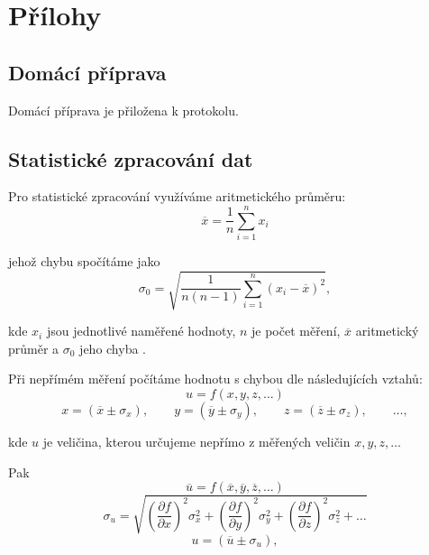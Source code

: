 \documentclass[english]{article}
\begin{document}
\section{Přílohy}

\subsection{Domácí příprava}
	Domácí příprava je přiložena k protokolu.
\newpage
\subsection{Statistické zpracování dat}
	Pro statistické zpracování využíváme aritmetického průměru:
	\begin{equation} \label{eq:aritmeticky_prumer}
	\overline{x} = \frac{1}{n}\sum\limits_{i=1}^{n}x_i
	\end{equation}
	
	jehož chybu spočítáme jako 
	\begin{equation} \label{eq:chyba_aritmetickeho_prumeru}
	\sigma_0 = \sqrt{\frac{1}{n(n-1)} \sum\limits_{i=1}^{n}\left( x_i - \overline{x} \right)^2 },
	\end{equation}
	
	kde $ x_i $ jsou jednotlivé naměřené hodnoty, $ n $ je počet měření, $ \overline{x} $ aritmetický průměr a $ \sigma_0 $ jeho chyba \cite{bib:chyby}.
	
	Při nepřímém měření počítáme hodnotu s chybou dle následujících vztahů:
	\begin{equation}
	u = f(x, y, z, \ldots)
	\end{equation}
	\begin{displaymath}
	x = (\overline{x} \pm \sigma_x), \qquad
	y = (\overline{y} \pm \sigma_y), \qquad
	z = (\overline{z} \pm \sigma_z), \qquad
	\ldots,
	\end{displaymath}
	
	kde $ u $ je veličina, kterou určujeme nepřímo z měřených veličin $ x, y, z, \ldots $ 
	
	Pak
	\begin{displaymath}
	\overline{u} = f(\overline{x}, \overline{y}, \overline{z}, \ldots)
	\end{displaymath}
	\begin{equation}\label{eq:chyba_neprime_mereni}
	\sigma_u = \sqrt{\left( \frac{\partial f}{\partial x} \right)^2 \sigma^2_x + \left( \frac{\partial f}{\partial y} \right)^2 \sigma^2_y + \left( \frac{\partial f}{\partial z} \right)^2 \sigma^2_z + \ldots}
	\end{equation}
	\begin{displaymath}
	u = (\overline{u} \pm \sigma_ u),
	\end{displaymath}
\newpage
\end{document}
